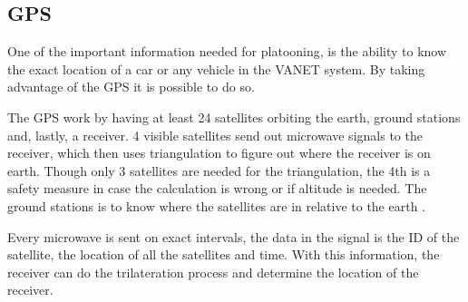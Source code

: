\subsection{GPS}
One of the important information needed for platooning, is the ability to know the exact location of a car or any vehicle in the \acrshort{VANET} system. By taking advantage of the \acrfull{GPS} it is possible to do so.\par
% 
% 
The GPS work by having at least 24 satellites orbiting the earth, ground stations and, lastly, a receiver. 4 visible satellites send out microwave signals to the receiver, which then uses triangulation to figure out where the receiver is on earth. Though only 3 satellites are needed for the triangulation, the 4th is a safety measure in case the calculation is wrong or if altitude is needed. The ground stations is to know where the satellites are in relative to the earth \cite{MiTACIntl.2011HowWork}.\par
% 
% 
Every microwave is sent on exact intervals, the data in the signal is the ID of the satellite, the location of all the satellites and time. With this information, the receiver can do the trilateration process and determine the location of the receiver.
